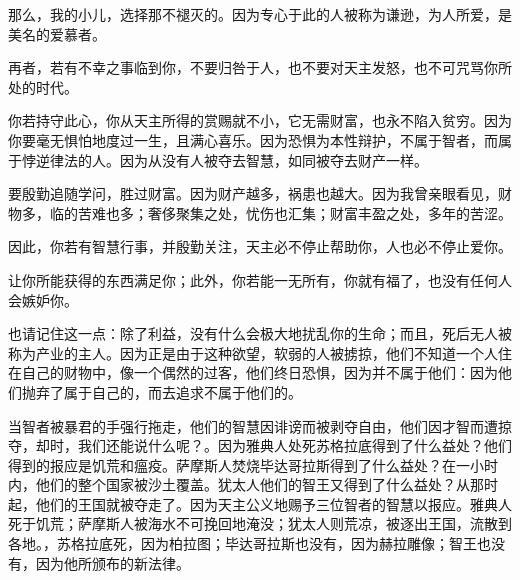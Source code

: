 那么，我的小儿，选择那不褪灭的。因为专心于此的人被称为谦逊，为人所爱，是美名的爱慕者。\newline{}\par

再者，若有不幸之事临到你，不要归咎于人，也不要对天主发怒，也不可咒骂你所处的时代。\newline{}\par

你若持守此心，你从天主所得的赏赐就不小，它无需财富，也永不陷入贫穷。因为你要毫无惧怕地度过一生，且满心喜乐。因为恐惧为本性辩护，不属于智者，而属于悖逆律法的人。因为从没有人被夺去智慧，如同被夺去财产一样。\newline{}\par

要殷勤追随学问，胜过财富。因为财产越多，祸患也越大。因为我曾亲眼看见，财物多，临的苦难也多；奢侈聚集之处，忧伤也汇集；财富丰盈之处，多年的苦涩。\newline{}\par

因此，你若有智慧行事，并殷勤关注，天主必不停止帮助你，人也必不停止爱你。\newline{}\par

让你所能获得的东西满足你；此外，你若能一无所有，你就有福了，也没有任何人会嫉妒你。\newline{}\par

也请记住这一点：除了利益，没有什么会极大地扰乱你的生命；而且，死后无人被称为产业的主人。因为正是由于这种欲望，软弱的人被掳掠，他们不知道一个人住在自己的财物中，像一个偶然的过客，他们终日恐惧，因为并不属于他们：因为他们抛弃了属于自己的，而去追求不属于他们的。\newline{}\par

当智者被暴君的手强行拖走，他们的智慧因诽谤而被剥夺自由，他们因才智而遭掠夺，却时，我们还能说什么呢？。因为雅典人处死苏格拉底得到了什么益处？他们得到的报应是饥荒和瘟疫。萨摩斯人焚烧毕达哥拉斯得到了什么益处？在一小时内，他们的整个国家被沙土覆盖。犹太人他们的智王又得到了什么益处？从那时起，他们的王国就被夺走了。因为天主公义地赐予三位智者的智慧以报应。雅典人死于饥荒；萨摩斯人被海水不可挽回地淹没；犹太人则荒凉，被逐出王国，流散到各地。，苏格拉底死，因为柏拉图；毕达哥拉斯也没有，因为赫拉雕像；智王也没有，因为他所颁布的新法律。\newline{}\par

